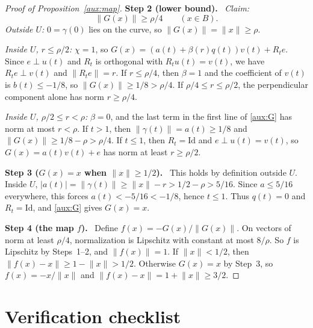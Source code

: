 \documentclass[11pt]{article}
\newcommand{\norm}[1]{\lVert #1\rVert}
\newcommand{\step}[1]{\par\smallskip\noindent\textbf{Step #1.}\ }
\theoremstyle{definition}
\numberwithin{equation}{section}
\begin{document}
\begin{proof}[Proof of Proposition~\ref{aux:map}]
\step{2 (lower bound)} \emph{Claim:}
\begin{equation}\label{aux:nonzero}
 \norm{G(x)}\ge\rho/4\qquad(x\in B).
\end{equation}
\emph{Outside $U$:} $0=\gamma(0)$ lies on the curve, so
$\norm{G(x)}=\norm x\ge\rho$.

\emph{Inside $U$, $r\le\rho/2$:} $\chi=1$, so
$G(x)=(a(t)+\beta(r)q(t))v(t)+R_te$. Since $e\perp u(t)$ and $R_t$ is
orthogonal with $R_tu(t)=v(t)$, we have $R_te\perp v(t)$ and
$\norm{R_te}=r$. If $r\le\rho/4$, then $\beta=1$ and the coefficient of
$v(t)$ is $b(t)\le-1/8$, so $\norm{G(x)}\ge1/8>\rho/4$. If
$\rho/4\le r\le\rho/2$, the perpendicular component alone has norm
$r\ge\rho/4$.

\emph{Inside $U$, $\rho/2\le r<\rho$:} $\beta=0$, and the last term in the
first line of \eqref{aux:G} has norm at most $r<\rho$. If $t>1$, then
$\norm{\gamma(t)}=a(t)\ge1/8$ and
$\norm{G(x)}\ge1/8-\rho>\rho/4$. If $t\le1$, then $R_t=\mathrm{Id}$ and
$e\perp u(t)=v(t)$, so $G(x)=a(t)v(t)+e$ has norm at least $r\ge\rho/2$.

\step{3 ($G(x)=x$ when $\norm x\ge1/2$)} This holds by definition outside
$U$. Inside $U$, $|a(t)|=\norm{\gamma(t)}\ge\norm x-r>1/2-\rho>5/16$. Since
$a\le5/16$ everywhere, this forces $a(t)<-5/16<-1/8$, hence $t\le1$. Thus
$q(t)=0$ and $R_t=\mathrm{Id}$, and \eqref{aux:G} gives $G(x)=x$.

\step{4 (the map $f$)} Define $f(x)=-G(x)/\norm{G(x)}$. On vectors of norm
at least $\rho/4$, normalization is Lipschitz with constant at most
$8/\rho$. So $f$ is Lipschitz by Steps~1--2, and $\norm{f(x)}=1$. If
$\norm x<1/2$, then $\norm{f(x)-x}\ge1-\norm x>1/2$. Otherwise $G(x)=x$ by
Step~3, so $f(x)=-x/\norm x$ and $\norm{f(x)-x}=1+\norm x\ge3/2$.
\end{proof}

\section*{Verification checklist}
\end{document}
